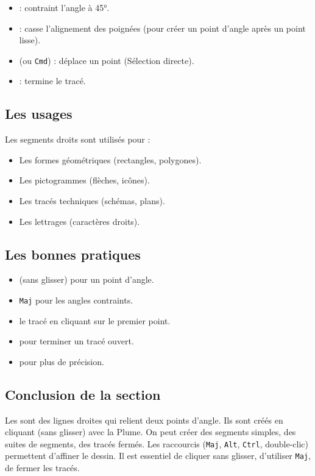 \begin{itemize}
    \item {} : contraint l'angle à 45°.
    \item {} : casse l'alignement des poignées (pour créer un point d'angle après un point lisse).
    \item {} (ou \texttt{Cmd}) : déplace un point (Sélection directe).
    \item {} : termine le tracé.
\end{itemize}

\subsection{Les usages}

Les segments droits sont utilisés pour :

\begin{itemize}
    \item Les formes géométriques (rectangles, polygones).
    \item Les pictogrammes (flèches, icônes).
    \item Les tracés techniques (schémas, plans).
    \item Les lettrages (caractères droits).
\end{itemize}

\subsection{Les bonnes pratiques}

\begin{itemize}
    \item {} (sans glisser) pour un point d'angle.
    \item {} \texttt{Maj} pour les angles contraints.
    \item {} le tracé en cliquant sur le premier point.
    \item {} pour terminer un tracé ouvert.
    \item {} pour plus de précision.
\end{itemize}

\subsection*{Conclusion de la section}

Les  sont des lignes droites qui relient deux points d'angle. Ils sont créés en cliquant (sans glisser) avec la Plume. On peut créer des segments simples, des suites de segments, des tracés fermés. Les raccourcis (\texttt{Maj}, \texttt{Alt}, \texttt{Ctrl}, double-clic) permettent d'affiner le dessin. Il est essentiel de cliquer sans glisser, d'utiliser \texttt{Maj}, de fermer les tracés.

